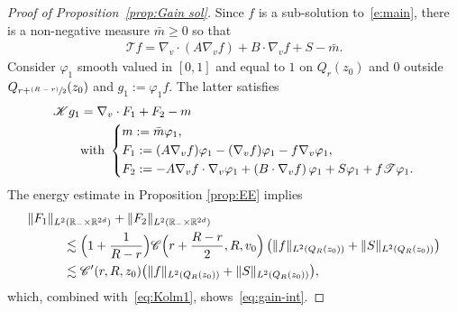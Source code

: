 \documentclass[JEP,XML,SOM,Unicode,NoFloatCountersInSection,published]{cedram}
\let\mathcal\mathscr
\newcommand{\psfrac}[2]{\sfrac{(#1)}{#2}}
\theoremstyle{definition}
\theoremstyle{remark}
\newcommand\R{{\mathbb R}}
\newcommand{\cC}{\mathcal C}
\newcommand{\cK}{\mathcal K}
\newcommand{\cT}{\mathcal T}
\begin{document}
\begin{proof}[Proof of Proposition~\ref{prop:Gain sol}]
Since $f$ is a sub-solution to~\eqref{e:main}, there is a
non-negative measure $\bar m \ge 0$ so that
\begin{align*}
\cT f =\nabla_v\cdot (A\nabla_v f) + B \cdot \nabla_v f
+ S - \bar m.
\end{align*}
Consider $\varphi_1$ smooth valued in $[0,1]$ and equal to $1$
on $Q_r(z_0)$ and $0$ outside $Q_{r+\psfrac{R-r}{2}}(z_0)$ and
$g_1:=\varphi_1 f$. The latter satisfies
\begin{equation}
\label{eq:ineqKg}
\begin{aligned}
\cK g_1 &= \nabla_v \cdot F_1+F_2 - m \\
&\text{with }
\begin{dcases}
m:= \bar m \varphi_1, \\
F_1 := (A\nabla_v f) \varphi_1-(\nabla_v
f) \varphi_1 - f \nabla_v \varphi_1, \\
F_2:= -A\nabla_v f\cdot \nabla_v \varphi_1+ \left( B
\cdot \nabla_v f \right)\varphi_1 + S\varphi_1 + f \cT
\varphi_1.
\end{dcases}
\end{aligned}
\end{equation}
The energy estimate in Proposition \ref{prop:EE} implies
\begin{align*}
& \| F_1 \|_{L^2(\R_- \times \R^{2d})} + \| F_2 \|_{L^2(\R_-
\times \R^{2d})} \\
& \hspace{1cm} \lesssim \Bigl( 1+\frac{1}{R-r} \Bigr)
\cC\Bigl(r+\frac{R-r}{2}, R,v_0\Bigr)
\left( \| f \|_{L^2\left(Q_R(z_0)\right)}
+ \| S \|_{L^2(Q_R(z_0))} \right) \\
& \hspace{1cm} \lesssim \cC'(r,R,z_0) \bigl( \| f
\|_{L^2(Q_R(z_0))} + \| S \|_{L^2(Q_R(z_0))} \bigr),
\end{align*}
which, combined with~\eqref{eq:Kolm1},
shows~\eqref{eq:gain-int}.


\end{proof}
\end{document}
